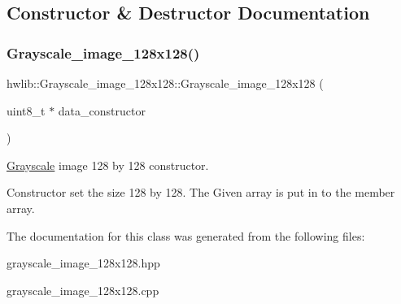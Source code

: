 \subsection{Constructor \& Destructor Documentation}
\mbox{\label{classhwlib_1_1Grayscale__image__128x128_ad51141cb4b7afb259709d7173c7a11b4}} 
\subsubsection{\texorpdfstring{Grayscale\+\_\+image\+\_\+128x128()}{Grayscale\_image\_128x128()}}
{\footnotesize\ttfamily hwlib\+::\+Grayscale\+\_\+image\+\_\+128x128\+::\+Grayscale\+\_\+image\+\_\+128x128 (\begin{DoxyParamCaption}\item[{uint8\+\_\+t $\ast$}]{data\+\_\+constructor }\end{DoxyParamCaption})\hspace{0.3cm}{\ttfamily [inline]}}



\hyperlink{classhwlib_1_1Grayscale}{Grayscale} image 128 by 128 constructor. 

Constructor set the size 128 by 128. The Given array is put in to the member array. 

The documentation for this class was generated from the following files\+:\begin{DoxyCompactItemize}
\item 
grayscale\+\_\+image\+\_\+128x128.\+hpp\item 
grayscale\+\_\+image\+\_\+128x128.\+cpp\end{DoxyCompactItemize}
